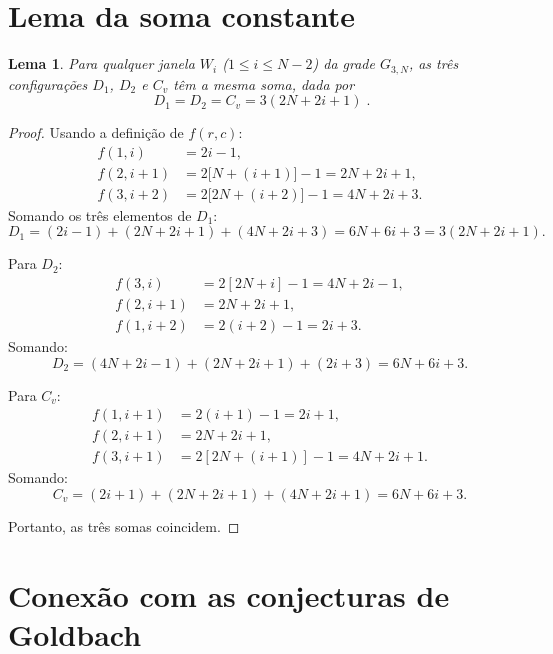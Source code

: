 \documentclass[12pt, a4paper]{article}
\newtheorem{lema}{Lema}
\begin{document}
	\section{Lema da soma constante}
	
	\begin{lema}
		Para qualquer janela $W_i$ ($1\le i\le N-2$) da grade $G_{3,N}$, as três configurações $D_1$, $D_2$ e $C_v$ têm a mesma soma, dada por
		\[
		\boxed{\;D_1 = D_2 = C_v = 3(2N+2i+1)\; }.
		\]
	\end{lema}
	
	\begin{proof}
		Usando a definição de $f(r,c)$:
		\begin{align*}
			f(1,i) &= 2i-1,\\
			f(2,i+1) &= 2\bigl[N+(i+1)\bigr]-1 = 2N+2i+1,\\
			f(3,i+2) &= 2\bigl[2N+(i+2)\bigr]-1 = 4N+2i+3.
		\end{align*}
		Somando os três elementos de $D_1$:
		\[
		D_1 = (2i-1)+(2N+2i+1)+(4N+2i+3)=6N+6i+3 = 3(2N+2i+1).
		\]
		
		Para $D_2$:
		\begin{align*}
			f(3,i) &= 2[2N+i]-1 = 4N+2i-1,\\
			f(2,i+1) &= 2N+2i+1,\\
			f(1,i+2) &= 2(i+2)-1 = 2i+3.
		\end{align*}
		Somando:
		\[
		D_2 = (4N+2i-1)+(2N+2i+1)+(2i+3)=6N+6i+3.
		\]
		
		Para $C_v$:
		\begin{align*}
			f(1,i+1) &= 2(i+1)-1 = 2i+1,\\
			f(2,i+1) &= 2N+2i+1,\\
			f(3,i+1) &= 2[2N+(i+1)]-1 = 4N+2i+1.
		\end{align*}
		Somando:
		\[
		C_v = (2i+1)+(2N+2i+1)+(4N+2i+1)=6N+6i+3.
		\]
		
		Portanto, as três somas coincidem. 
	\end{proof}
	
	\section{Conexão com as conjecturas de Goldbach}
	
\end{document}
